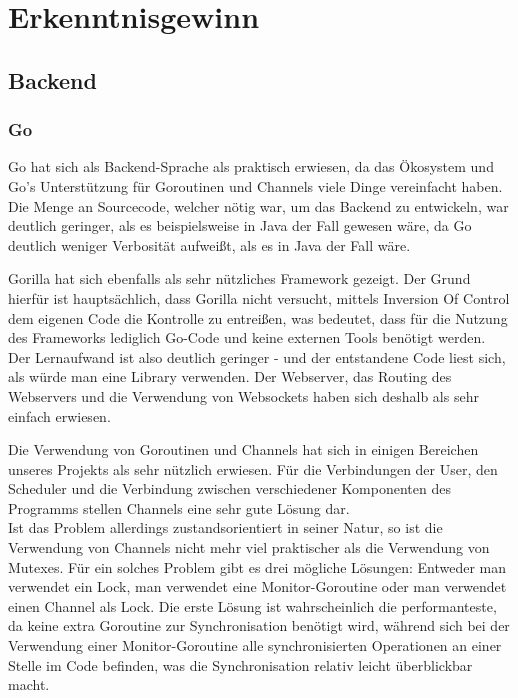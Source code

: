 \section{Erkenntnisgewinn}
\subsection{Backend}
\subsubsection{Go}
Go hat sich als Backend-Sprache als praktisch erwiesen, da das Ökosystem und Go's Unterstützung für Goroutinen und Channels viele Dinge vereinfacht haben. \\
Die Menge an Sourcecode, welcher nötig war, um das Backend zu entwickeln, war deutlich geringer, als es beispielsweise in Java der Fall gewesen wäre, da Go deutlich weniger Verbosität aufweißt, als es in Java der Fall wäre.

Gorilla hat sich ebenfalls als sehr nützliches Framework gezeigt. Der Grund hierfür ist hauptsächlich, dass Gorilla nicht versucht, mittels Inversion Of Control dem eigenen Code die Kontrolle zu entreißen, was bedeutet, dass für die Nutzung des Frameworks lediglich Go-Code und keine externen Tools benötigt werden. Der Lernaufwand ist also deutlich geringer - und der entstandene Code liest sich, als würde man eine Library verwenden.
Der Webserver, das Routing des Webservers und die Verwendung von Websockets haben sich deshalb als sehr einfach erwiesen.

Die Verwendung von Goroutinen und Channels hat sich in einigen Bereichen unseres Projekts als sehr nützlich erwiesen. Für die Verbindungen der User, den Scheduler und die Verbindung zwischen verschiedener Komponenten des Programms stellen Channels eine sehr gute Lösung dar. \\
Ist das Problem allerdings zustandsorientiert in seiner Natur, so ist die Verwendung von Channels nicht mehr viel praktischer als die Verwendung von Mutexes. Für ein solches Problem gibt es drei mögliche Lösungen: Entweder man verwendet ein Lock, man verwendet eine Monitor-Goroutine oder man verwendet einen Channel als Lock. Die erste Lösung ist wahrscheinlich die performanteste, da keine extra Goroutine zur Synchronisation benötigt wird, während sich bei der Verwendung einer Monitor-Goroutine alle synchronisierten Operationen an einer Stelle im Code befinden, was die Synchronisation relativ leicht überblickbar macht.

